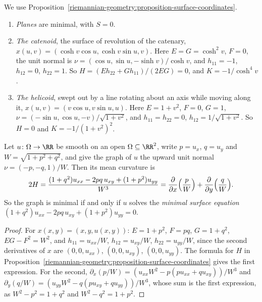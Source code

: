 \begin{example}\label{riemannian-geometry:example-minimal-surfaces}
We use Proposition~\ref{riemannian-geometry:proposition-surface-coordinates}.
\begin{enumerate}
\item \emph{Planes} are minimal, with $S = 0$.
\item \emph{The catenoid}, the surface of revolution of the catenary, $x(u, v) = (\cosh v\cos u, \cosh v\sin u, v)$. Here $E = G = \cosh^2v$, $F = 0$, the unit normal is
$\nu = (\cos u, \sin u, -\sinh v)/\cosh v$, and $h_{11} = -1$, $h_{12} = 0$, $h_{22} = 1$. So $H = (Eh_{22} + Gh_{11})/(2EG) = 0$, and $K = -1/\cosh^4v$.
\item \emph{The helicoid}, swept out by a line rotating about an axis while moving along it, $x(u, v) = (v\cos u, v\sin u, u)$. Here $E = 1 + v^2$, $F = 0$, $G = 1$,
$\nu = (-\sin u, \cos u, -v)/\sqrt{1 + v^2}$, and $h_{11} = h_{22} = 0$, $h_{12} = 1/\sqrt{1 + v^2}$. So $H = 0$ and $K = -1/(1 + v^2)^2$.
\end{enumerate}
\end{example}

\begin{proposition}\label{riemannian-geometry:proposition-minimal-surface-equation}
Let $u \colon \Omega \to \RR$ be smooth on an open $\Omega \subseteq \RR^2$, write $p = u_x$, $q = u_y$ and $W = \sqrt{1 + p^2 + q^2}$, and give the graph of $u$ the upward unit
normal $\nu = (-p, -q, 1)/W$. Then its mean curvature is
\[
2H = \frac{(1 + q^2)u_{xx} - 2pq\,u_{xy} + (1 + p^2)u_{yy}}{W^3} = \frac{\partial}{\partial x}\Bigl(\frac pW\Bigr) + \frac{\partial}{\partial y}\Bigl(\frac qW\Bigr).
\]
So the graph is minimal if and only if $u$ solves the \emph{minimal surface equation} $(1 + q^2)u_{xx} - 2pq\,u_{xy} + (1 + p^2)u_{yy} = 0$.
\end{proposition}

\begin{proof}
For $x(x, y) = (x, y, u(x, y))$: $E = 1 + p^2$, $F = pq$, $G = 1 + q^2$, $EG - F^2 = W^2$, and $h_{11} = u_{xx}/W$, $h_{12} = u_{xy}/W$, $h_{22} = u_{yy}/W$, since the second
derivatives of $x$ are $(0, 0, u_{xx})$, $(0, 0, u_{xy})$, $(0, 0, u_{yy})$. The formula for $H$ in
Proposition~\ref{riemannian-geometry:proposition-surface-coordinates} gives the first expression. For the second,
$\partial_x(p/W) = (u_{xx}W^2 - p(pu_{xx} + qu_{xy}))/W^3$ and $\partial_y(q/W) = (u_{yy}W^2 - q(pu_{xy} + qu_{yy}))/W^3$, whose sum is the first expression, as
$W^2 - p^2 = 1 + q^2$ and $W^2 - q^2 = 1 + p^2$.
\end{proof}

